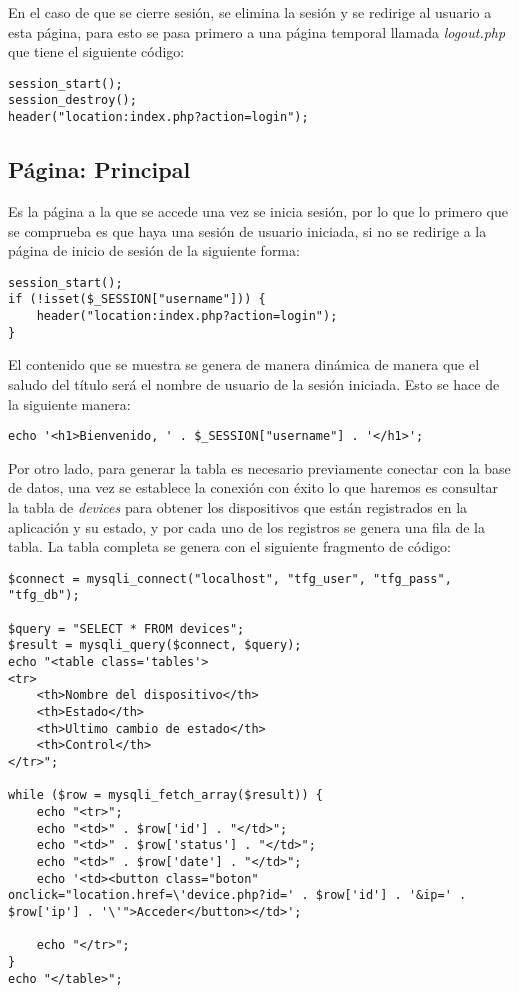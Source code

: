 En el caso de que se cierre sesión, se elimina la sesión y se redirige al usuario a esta página, para esto se pasa primero a una página temporal llamada \textit{logout.php} que tiene el siguiente código:
\begin{lstlisting}
session_start();
session_destroy();
header("location:index.php?action=login");
\end{lstlisting}

\subsection{Página: Principal}\label{subsec:implPagPrincipal}
Es la página a la que se accede una vez se inicia sesión, por lo que lo primero que se comprueba es que haya una sesión de usuario iniciada, si no se redirige a la página de inicio de sesión de la siguiente forma:
\begin{lstlisting}
session_start();
if (!isset($_SESSION["username"])) {
    header("location:index.php?action=login");
}
\end{lstlisting}

El contenido que se muestra se genera de manera dinámica de manera que el saludo del título será el nombre de usuario de la sesión iniciada. Esto se hace de la siguiente manera:
\begin{lstlisting}
echo '<h1>Bienvenido, ' . $_SESSION["username"] . '</h1>';
\end{lstlisting}

Por otro lado, para generar la tabla es necesario previamente conectar con la base de datos, una vez se establece la conexión con éxito lo que haremos es consultar la tabla de \textit{devices} para obtener los dispositivos que están registrados en la aplicación y su estado, y por cada uno de los registros se genera una fila de la tabla. La tabla completa se genera con el siguiente fragmento de código:
\begin{lstlisting}
$connect = mysqli_connect("localhost", "tfg_user", "tfg_pass", "tfg_db");

$query = "SELECT * FROM devices";
$result = mysqli_query($connect, $query);
echo "<table class='tables'>
<tr>
    <th>Nombre del dispositivo</th>
    <th>Estado</th>
    <th>Ultimo cambio de estado</th>
    <th>Control</th>
</tr>";

while ($row = mysqli_fetch_array($result)) {
    echo "<tr>";
    echo "<td>" . $row['id'] . "</td>";
    echo "<td>" . $row['status'] . "</td>";
    echo "<td>" . $row['date'] . "</td>";
    echo '<td><button class="boton" onclick="location.href=\'device.php?id=' . $row['id'] . '&ip=' . $row['ip'] . '\'">Acceder</button></td>';

    echo "</tr>";
}
echo "</table>";
\end{lstlisting}


